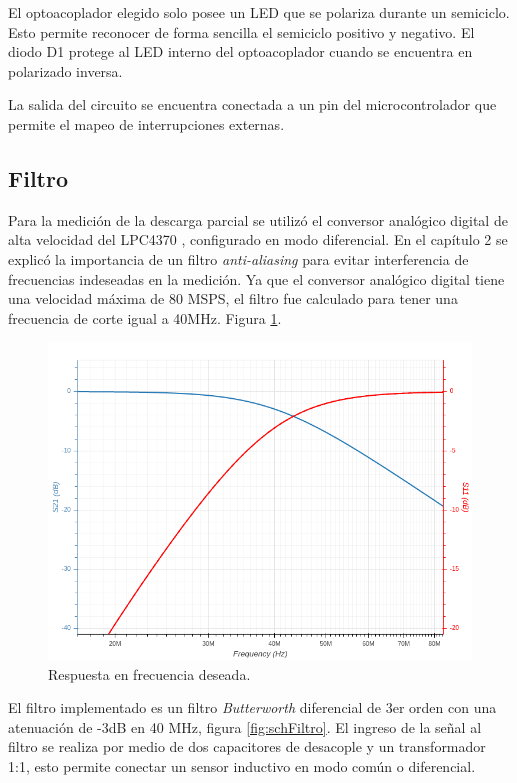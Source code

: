 \vspace{5mm}

El optoacoplador elegido solo posee un LED que se polariza durante un semiciclo. Esto permite reconocer de forma sencilla el semiciclo positivo y negativo. El diodo D1 protege al LED interno del optoacoplador cuando se encuentra en polarizado inversa.

La salida del circuito se encuentra conectada a un pin del microcontrolador que permite el mapeo de interrupciones externas.

\vspace{10mm}
\subsection{Filtro}

Para la medición de la descarga parcial se utilizó el conversor analógico digital de alta velocidad del LPC4370 \citep{micro:lpc4370}, configurado en modo diferencial. En el capítulo 2 se explicó la importancia de un filtro \textit{anti-aliasing} para evitar interferencia de frecuencias indeseadas en la medición. Ya que el conversor analógico digital tiene una velocidad máxima de 80 MSPS, el filtro fue calculado para tener una frecuencia de corte igual a 40MHz. Figura \ref{fig:respFrec}. 

\begin{figure}[ht]
	\centering
	\includegraphics[width=130mm]{./Figures/respFrec.png}
	\caption{Respuesta en frecuencia deseada.}
	\label{fig:respFrec}
\end{figure}


El filtro implementado es un filtro \textit{Butterworth} diferencial de 3er orden con una atenuación de -3dB en 40 MHz, figura \ref{fig:schFiltro}. El ingreso de la señal al filtro se realiza por medio de dos capacitores de desacople y un transformador 1:1, esto permite conectar un sensor inductivo en modo común o diferencial. 

